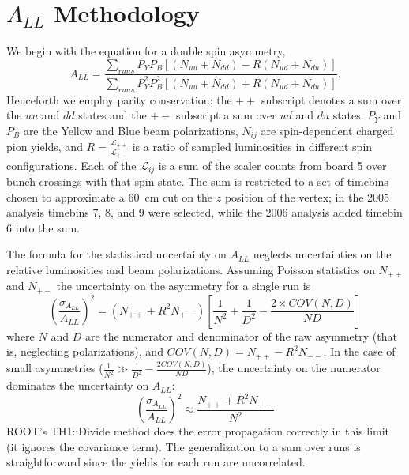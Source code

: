 \section{$A_{LL}$ Methodology}

We begin with the equation for a double spin asymmetry,
%
\begin{equation}
  A_{LL} = \frac{\sum_{runs} P_{Y}P_{B}\left[(N_{uu} + N_{dd}) - R(N_{ud} + N_{du})\right]}{\sum_{runs} P_{Y}^{2}P_{B}^{2}\left[(N_{uu} + N_{dd}) + R(N_{ud} + N_{du})\right]}.
\end{equation}
%
Henceforth we employ parity conservation; the \(++\) subscript denotes a sum
over the \(uu\) and \(dd\) states and the \(+-\) subscript a sum over \(ud\)
and \(du\) states. \(P_Y\) and \(P_B\) are the Yellow and Blue beam
polarizations, \(N_{ij}\) are spin-dependent charged pion yields, and \(R =
\frac{\mathcal{L}_{++}}{\mathcal{L}_{+-}}\) is a ratio of sampled luminosities
in different spin configurations. Each of the $\mathcal{L}_{ij}$ is a sum of
the scaler counts from board 5 over bunch crossings with that spin state. The
sum is restricted to a set of timebins chosen to approximate a 60~cm cut on
the $z$ position of the vertex; in the 2005 analysis timebins 7, 8, and 9 were
selected, while the 2006 analysis added timebin 6 into the sum.

The formula for the statistical uncertainty on \(A_{LL}\) neglects
uncertainties on the relative luminosities and beam polarizations. Assuming
Poisson statistics on \(N_{++}\) and \(N_{+-}\) the uncertainty on the
asymmetry for a single run is
%
\begin{equation}
  \left(\frac{\sigma_{A_{LL}}}{A_{LL}}\right)^2 = \left(N_{++} + R^2 N_{+-}\right)\left[\frac{1}{N^2} + \frac{1}{D^2} - \frac{2 \times COV(N,D)}{ND} \right]
\end{equation}
%
where \(N\) and \(D\) are the numerator and denominator of the raw asymmetry
(that is, neglecting polarizations), and \(COV(N,D) = N_{++} - R^2 N_{+-}\).
In the case of small asymmetries (\(\frac{1}{N^2} \gg \frac{1}{D^2} - \frac{2
COV(N,D)}{ND}\)), the uncertainty on the numerator dominates the uncertainty
on \(A_{LL}\):
%
\begin{equation}
  \left(\frac{\sigma_{A_{LL}}}{A_{LL}}\right)^2 \approx \frac{N_{++} + R^2 N_{+-}}{N^2}
\end{equation}
%
ROOT's TH1::Divide method does the error propagation correctly in this limit
(it ignores the covariance term). The generalization to a sum over runs is
straightforward since the yields for each run are uncorrelated.

